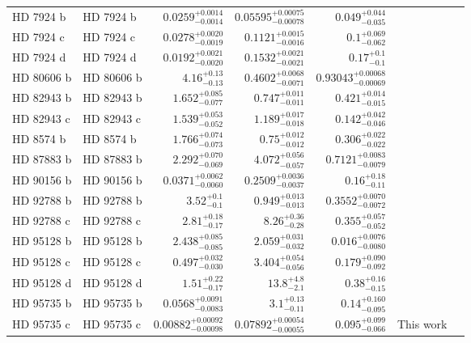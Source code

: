 \begin{longtable*}{llrrrrr}
HD 7924 b & HD 7924 b & $0.0259^{+0.0014}_{-0.0014}$ & $0.05595^{+0.00075}_{-0.00078}$ & $0.049^{+0.044}_{-0.035}$ & \cite{Fulton15} & \\ 
HD 7924 c & HD 7924 c & $0.0278^{+0.0020}_{-0.0019}$ & $0.1121^{+0.0015}_{-0.0016}$ & $0.1^{+0.069}_{-0.062}$ & \cite{Fulton15} & \\ 
HD 7924 d & HD 7924 d & $0.0192^{+0.0021}_{-0.0020}$ & $0.1532^{+0.0021}_{-0.0021}$ & $0.17^{+0.1}_{-0.1}$ & \cite{Fulton15} & \\ 
HD 80606 b & HD 80606 b & $4.16^{+0.13}_{-0.13}$ & $0.4602^{+0.0068}_{-0.0071}$ & $0.93043^{+0.00068}_{-0.00069}$ & \cite{Wittenmyer07} & \\ 
HD 82943 b & HD 82943 b & $1.652^{+0.085}_{-0.077}$ & $0.747^{+0.011}_{-0.011}$ & $0.421^{+0.014}_{-0.015}$ & \cite{Mayor04} & \\ 
HD 82943 c & HD 82943 c & $1.539^{+0.053}_{-0.052}$ & $1.189^{+0.017}_{-0.018}$ & $0.142^{+0.042}_{-0.046}$ & \cite{Mayor04} & \\ 
HD 8574 b & HD 8574 b & $1.766^{+0.074}_{-0.073}$ & $0.75^{+0.012}_{-0.012}$ & $0.306^{+0.022}_{-0.022}$ & \cite{Perrier03} & \\ 
HD 87883 b & HD 87883 b & $2.292^{+0.070}_{-0.069}$ & $4.072^{+0.056}_{-0.057}$ & $0.7121^{+0.0083}_{-0.0079}$ & \cite{Fischer09} & \\ 
HD 90156 b & HD 90156 b & $0.0371^{+0.0062}_{-0.0060}$ & $0.2509^{+0.0036}_{-0.0037}$ & $0.16^{+0.18}_{-0.11}$ & \cite{Mordasini11} & \\ 
HD 92788 b & HD 92788 b & $3.52^{+0.1}_{-0.1}$ & $0.949^{+0.013}_{-0.013}$ & $0.3552^{+0.0070}_{-0.0072}$ & \cite{Fischer01} & \\ 
HD 92788 c & HD 92788 c & $2.81^{+0.18}_{-0.17}$ & $8.26^{+0.36}_{-0.28}$ & $0.355^{+0.057}_{-0.052}$ & \cite{Rickman19} & \\ 
HD 95128 b & HD 95128 b & $2.438^{+0.085}_{-0.085}$ & $2.059^{+0.031}_{-0.032}$ & $0.016^{+0.0076}_{-0.0080}$ & \cite{Naef04} & \\ 
HD 95128 c & HD 95128 c & $0.497^{+0.032}_{-0.030}$ & $3.404^{+0.054}_{-0.056}$ & $0.179^{+0.090}_{-0.092}$ & \cite{Wittenmyer07} & \\ 
HD 95128 d & HD 95128 d & $1.51^{+0.22}_{-0.17}$ & $13.8^{+4.8}_{-2.1}$ & $0.38^{+0.16}_{-0.15}$ & \cite{Gregory10} & \\ 
HD 95735 b & HD 95735 b & $0.0568^{+0.0091}_{-0.0083}$ & $3.1^{+0.13}_{-0.11}$ & $0.14^{+0.160}_{-0.095}$ & \cite{Diaz19} & \\ 
HD 95735 c & HD 95735 c & $0.00882^{+0.00092}_{-0.00098}$ & $0.07892^{+0.00054}_{-0.00055}$ & $0.095^{+0.099}_{-0.066}$ & This work & \\ 

\end{longtable*}
